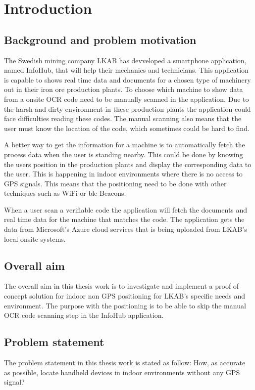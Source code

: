 \chapter{Introduction}\label{sec:intro} 

\section{Background and problem motivation}\label{sec:introBackground}
The Swedish mining company LKAB has devveloped
a smartphone application, named InfoHub, that will help their mechanics and
technicians.  This application is capable to shows real time data and documents
for a chosen type of machinery out in their iron ore production plants.  To
choose which machine to show data from a onsite OCR code need to be manually
scanned in the application.  Due to the harsh and dirty environment in these
production plants the application could face difficulties reading these codes.
The manual scanning also means that the user must know the location of the code,
which sometimes could be hard to find.

\bigskip

A better way to get the information for a machine is to automatically fetch the
process data when the user is standing nearby.  This could be done by knowing
the users position in the production plants and display the corresponding data
to the user.  This is happening in indoor environments where there is no access
to GPS signals.  This means that the positioning need to be done with other
techniques such as WiFi or \acrlong{ble} Beacons.

\bigskip

When a user scan a verifiable code the application will fetch the documents and
real time data for the machine that matches the code.  The application gets the
data from Microsoft's Azure cloud services that is being uploaded from LKAB's
local onsite systems.


\section{Overall aim}\label{sec:introOverallAim}
The overall aim in this thesis work is to investigate and implement a proof of concept solution for indoor non GPS positioning for LKAB's specific needs and environment.
The purpose with the positioning is to be able to skip the manual OCR code scanning step in the InfoHub application.


\section{Problem statement}\label{sec:introProblemStatement}
The problem statement in this thesis work is stated as follow: How, as accurate as possible, locate handheld devices in indoor environments without any GPS signal?


